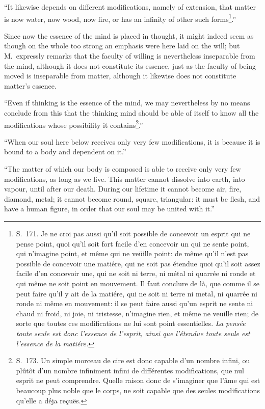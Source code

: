 \documentclass[12pt,a4paper]{article}
\begin{document}
``It likewise depends on different modifications, namely of extension, that matter
is now water, now wood, now fire, or has an infinity of other such
forms\footnote{S.~171. Je ne croi pas aussi qu'il soit possible de concevoir un
esprit qui ne pense point, quoi qu'il soit fort facile d'en concevoir un qui ne
sente point, qui n'imagine point, et même qui ne veüille point: de même qu'il
n'est pas possible de concevoir une matiére, qui ne soit pas étendue quoi qu'il
soit assez facile d'en concevoir une, qui ne soit ni terre, ni métal ni quarrée
ni ronde et qui même ne soit point en mouvement. Il faut conclure de là, que
comme il se peut faire qu'il y ait de la matiére, qui ne soit ni terre ni metal,
ni quarrée ni ronde ni même en mouvement: il se peut faire aussi qu'un esprit ne
sente ni chaud ni froid, ni joie, ni tristesse, n'imagine rien, et même ne veuille
rien; de sorte que toutes ces modifications ne lui sont point essentielles.
\emph{La pensée toute seule est donc l'essence de l'esprit, ainsi que l'étendue
toute seule est l'essence de la matiére.}}.''

Since now the essence of the mind is placed in thought, it might indeed seem as
though on the whole too strong an emphasis were here laid on the will; but M.\
expressly remarks that the faculty of willing is nevertheless inseparable from the
mind, although it does not constitute its essence, just as the faculty of being
moved is inseparable from matter, although it likewise does not constitute
matter's essence.

``Even if thinking is the essence of the mind, we may nevertheless by no means
conclude from this that the thinking mind should be able of itself to know all the
modifications whose possibility it contains\footnote{S.~173. Un simple morceau de
cire est donc capable d'un nombre infini, ou plûtôt d'un nombre infiniment infini
de différentes modifications, que nul esprit ne peut comprendre. Quelle raison
donc de s'imaginer que l'âme qui est beaucoup plus noble que le corps, ne soit
capable que des seules modifications qu'elle a déja reçuës.}.''

``When our soul here below receives only very few modifications, it is because it
is bound to a body and dependent on it.''

``The matter of which our body is composed is able
to receive only very few modifications, as long as we live. This matter cannot
dissolve into earth, into vapour, until after our death. During our lifetime it
cannot become air, fire, diamond, metal; it cannot become round, square,
triangular: it must be flesh, and have a human figure, in order that our soul may
be united with it.''
\end{document}
